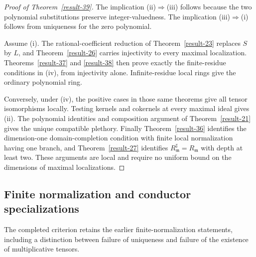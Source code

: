 \documentclass[11pt,a4paper]{article}
\theoremstyle{definition}
\begin{document}
\begin{proof}[Proof of Theorem~\ref{result-39}]
The implication (ii)$\Rightarrow$(iii) follows because the two
polynomial substitutions preserve integer-valuedness. The implication
(iii)$\Rightarrow$(i) follows from uniqueness for the zero polynomial.

Assume (i). The rational-coefficient reduction of
Theorem~\ref{result-23} replaces $S$ by $L$, and
Theorem~\ref{result-26} carries injectivity to every maximal
localization. Theorems~\ref{result-37} and \ref{result-38} then
prove exactly the finite-residue conditions in (iv), from
injectivity alone. Infinite-residue local rings give the ordinary
polynomial ring.

Conversely, under (iv), the positive cases in those same theorems
give all tensor isomorphisms locally. Testing kernels and cokernels
at every maximal ideal gives (ii). The polynomial identities and
composition argument of Theorem~\ref{result-21} gives the unique
compatible plethory. Finally Theorem~\ref{result-36} identifies the
dimension-one domain-completion condition with finite local
normalization having one branch, and Theorem~\ref{result-27}
identifies $R_{\mathfrak m}^{\sharp}=R_{\mathfrak m}$ with depth
at least two. These arguments are local and require no uniform
bound on the dimensions of maximal localizations.
\end{proof}

\subsection{Finite normalization and conductor specializations}
The completed criterion retains the earlier finite-normalization
statements, including a distinction between failure of uniqueness and
failure of the existence of multiplicative tensors.
\end{document}
